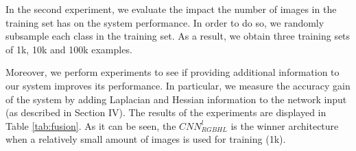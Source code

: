 \documentclass[review,12pt,3p]{elsarticle}
\begin{document}
\begin{table}[!ht]
\centering
{}
\caption{Confusion matrix for our method $CNN_{RGB}$. The numbers represent percentages.}
\label{tab:resCNN}
\end{table}

In the second experiment, we evaluate the impact the number of images in the training set has on the system performance. In order to do so, we randomly subsample each class in the training set. As a result, we obtain three training sets of 1k, 10k and 100k examples.

Moreover, we perform experiments to see if providing additional information to our system improves its performance. In particular, we measure the accuracy gain of the system by adding Laplacian and Hessian information to the network input (as described in Section IV). The results of the experiments are displayed in Table \ref{tab:fusion}. As it can be seen, the $CNN^l_{RGBHL}$ is the winner architecture when a relatively small amount of images is used for training (1k).
\end{document}
